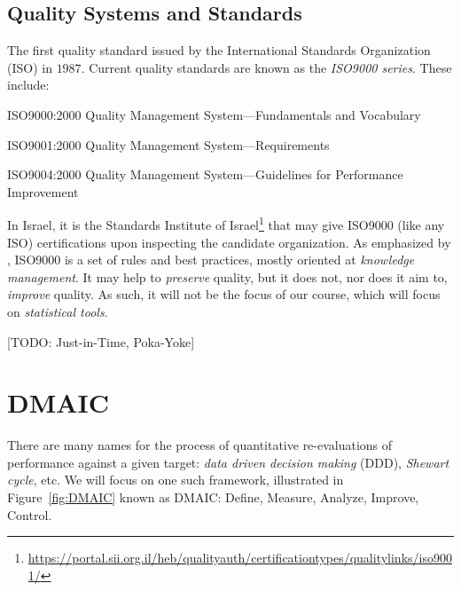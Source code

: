 \documentclass[12pt,a4paper]{report}
\begin{document}
\subsection{Quality Systems and Standards}
The first quality standard issued by the International Standards Organization (ISO) in $1987$.
Current quality standards are known as the \emph{ISO9000 series}. These include:
\begin{description}
\item ISO9000:2000 Quality Management System—Fundamentals and Vocabulary
\item ISO9001:2000 Quality Management System—Requirements
\item ISO9004:2000 Quality Management System—Guidelines for Performance Improvement
\end{description}
In Israel, it is the Standards Institute of Israel\footnote{\url{https://portal.sii.org.il/heb/qualityauth/certificationtypes/qualitylinks/iso9001/}} that may give ISO9000 (like any ISO) certifications upon inspecting the candidate organization.
As emphasized by \citet[p.24]{montgomery_introduction_2007}, ISO9000 is a set of rules and best practices, mostly oriented at \emph{knowledge management}. 
It may help to \emph{preserve} quality, but it does not, nor does it aim to, \emph{improve} quality.
As such, it will not be the focus of our course, which will focus on \emph{statistical tools}.


\begin{extra}

[TODO: Just-in-Time, Poka-Yoke]

\end{extra}




\section{DMAIC}
There are many names for the process of quantitative re-evaluations of performance against a given target: \emph{data driven decision making} (DDD), \emph{Shewart cycle}, etc.
We will focus on one such framework, illustrated in Figure~\ref{fig:DMAIC} known as DMAIC: Define, Measure, Analyze, Improve, Control.
\end{document}
